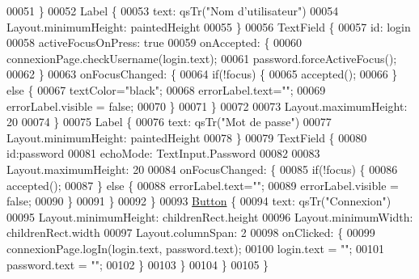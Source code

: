 \begin{DoxyCode}
00051         \}
00052         Label \{
00053             text: qsTr(\textcolor{stringliteral}{"Nom d'utilisateur"})
00054             Layout.minimumHeight: paintedHeight
00055         \}
00056         TextField \{
00057             \textcolor{keywordtype}{id}: login
00058             activeFocusOnPress: \textcolor{keyword}{true}
00059             onAccepted: \{
00060                 connexionPage.checkUsername(login.text);
00061                 password.forceActiveFocus();
00062             \}
00063             onFocusChanged: \{
00064                 \textcolor{keywordflow}{if}(!focus) \{
00065                     accepted();
00066                 \} \textcolor{keywordflow}{else} \{
00067                     textColor=\textcolor{stringliteral}{"black"};
00068                     errorLabel.text=\textcolor{stringliteral}{""};
00069                     errorLabel.visible = \textcolor{keyword}{false};
00070                 \}
00071             \}
00072 
00073             Layout.maximumHeight: 20
00074         \}
00075         Label \{
00076             text: qsTr(\textcolor{stringliteral}{"Mot de passe"})
00077             Layout.minimumHeight: paintedHeight
00078         \}
00079         TextField \{
00080             \textcolor{keywordtype}{id}:password
00081             echoMode: TextInput.Password
00082 
00083             Layout.maximumHeight: 20
00084             onFocusChanged: \{
00085                 \textcolor{keywordflow}{if}(!focus) \{
00086                     accepted();
00087                 \} \textcolor{keywordflow}{else} \{
00088                     errorLabel.text=\textcolor{stringliteral}{""};
00089                     errorLabel.visible = \textcolor{keyword}{false};
00090                 \}
00091             \}
00092         \}
00093         \hyperlink{classButton}{Button} \{
00094             text: qsTr(\textcolor{stringliteral}{"Connexion"})
00095             Layout.minimumHeight: childrenRect.height
00096             Layout.minimumWidth: childrenRect.width
00097             Layout.columnSpan: 2
00098             onClicked: \{
00099                 connexionPage.logIn(login.text, password.text);
00100                 login.text = \textcolor{stringliteral}{""};
00101                 password.text = \textcolor{stringliteral}{""};
00102             \}
00103         \}
00104     \}
00105 \}
\end{DoxyCode}
